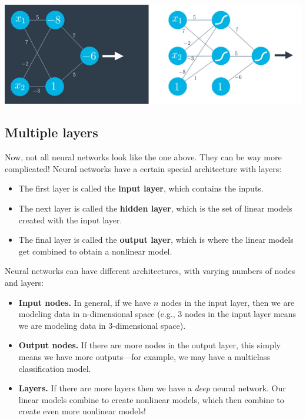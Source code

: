 \includegraphics[width=1\linewidth]{img//intro//introNN/neural-network-architecture-8.png}

\subsection{Multiple layers}

Now, not all neural networks look like the one above. They can be way more complicated! Neural networks have a certain special architecture with layers:

\begin{itemize}
    \item The first layer is called the \textbf{input layer}, which contains the inputs.
    \item The next layer is called the \textbf{hidden layer}, which is the set of linear models created with the input layer.
    \item The final layer is called the \textbf{output layer}, which is where the linear models get combined to obtain a nonlinear model.
\end{itemize}

Neural networks can have different architectures, with varying numbers of nodes and layers:

\begin{itemize}
    \item \textbf{Input nodes.} In general, if we have \(n\) nodes in the input layer, then we are modeling data in n-dimensional space (e.g., 3 nodes in the input layer means we are modeling data in 3-dimensional space).
    \item \textbf{Output nodes.} If there are more nodes in the output layer, this simply means we have more outputs—for example, we may have a multiclass classification model.
    \item \textbf{Layers.} If there are more layers then we have a \textit{deep} neural network. Our linear models combine to create nonlinear models, which then combine to create even more nonlinear models!
\end{itemize}


